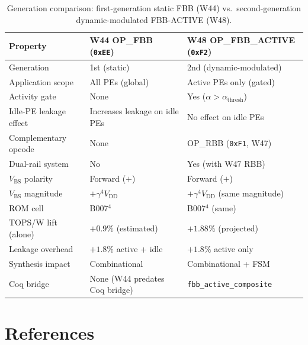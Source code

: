 \documentclass[12pt,a4paper]{report}
\theoremstyle{plain}
\theoremstyle{definition}
\theoremstyle{remark}
\newcommand{\opcode}[1]{\texttt{#1}}
\newcommand{\vdd}{V_{\mathrm{DD}}}
\newcommand{\gammaFour}{\gamma^{4}}
\begin{document}
\begin{table}[h!]
\centering
\caption{Generation comparison: first-generation static FBB (W44) vs.\
second-generation dynamic-modulated FBB-ACTIVE (W48).}
\label{tab:gen_comparison}
\begin{tabular}{lll}
\toprule
Property & W44 OP\_FBB (\opcode{0xEE}) & W48 OP\_FBB\_ACTIVE (\opcode{0xF2}) \\
\midrule
Generation & 1st (static) & 2nd (dynamic-modulated) \\
Application scope & All PEs (global) & Active PEs only (gated) \\
Activity gate & None & Yes ($\alpha > \alpha_{\mathrm{thresh}}$) \\
Idle-PE leakage effect & Increases leakage on idle PEs & No effect on idle PEs \\
Complementary opcode & None & OP\_RBB (\opcode{0xF1}, W47) \\
Dual-rail system & No & Yes (with W47 RBB) \\
$V_{\mathrm{BS}}$ polarity & Forward ($+$) & Forward ($+$) \\
$V_{\mathrm{BS}}$ magnitude & $+\gammaFour \vdd$ & $+\gammaFour \vdd$ (same magnitude) \\
ROM cell & B007$^{4}$ & B007$^{4}$ (same) \\
TOPS/W lift (alone) & $+0.9\%$ (estimated) & $+1.88\%$ (projected) \\
Leakage overhead & $+1.8\%$ active + idle & $+1.8\%$ active only \\
Synthesis impact & Combinational & Combinational + FSM \\
Coq bridge & None (W44 predates Coq bridge) & \texttt{fbb\_active\_composite} \\
\bottomrule
\end{tabular}
\end{table}

\chapter{References}
\label{app:references}
\end{document}
